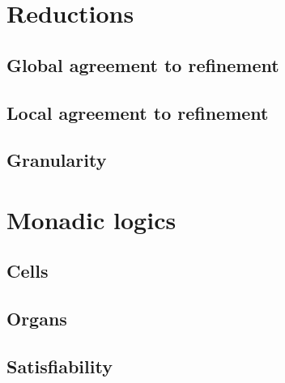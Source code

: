 \documentclass{scrbook}
\begin{document}
\chapter{Reductions}


\section{Global agreement to refinement}


\section{Local agreement to refinement}


\section{Granularity}\label{sec:granularity}


%

%

%

%

\chapter{Monadic logics}\label{ch:monadic-firstorder}


\section{Cells}


\section{Organs}


\section{Satisfiability}




\end{document}

